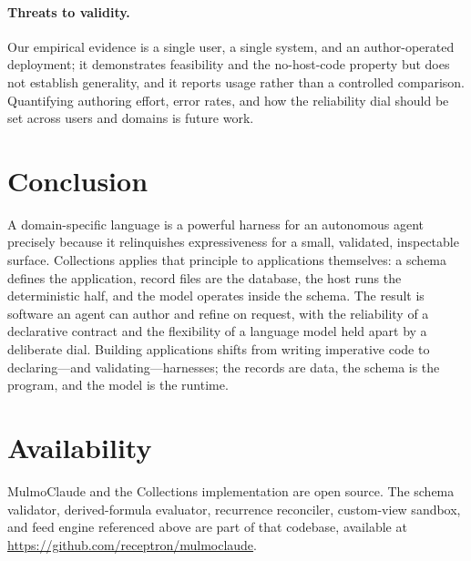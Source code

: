 \documentclass[11pt]{article}
\begin{document}
\paragraph{Threats to validity.}
Our empirical evidence is a single user, a single system, and an author-operated
deployment; it demonstrates feasibility and the no-host-code property but does not
establish generality, and it reports usage rather than a controlled comparison.
Quantifying authoring effort, error rates, and how the reliability dial should be
set across users and domains is future work.

\section{Conclusion}
\label{sec:conclusion}

A domain-specific language is a powerful harness for an autonomous agent precisely
because it relinquishes expressiveness for a small, validated, inspectable
surface. Collections applies that principle to applications themselves: a schema
defines the application, record files are the database, the host runs the
deterministic half, and the model operates inside the schema. The result is
software an agent can author and refine on request, with the reliability of a
declarative contract and the flexibility of a language model held apart by a
deliberate dial. Building applications shifts from writing imperative code to
declaring---and validating---harnesses; the records are data, the schema is the
program, and the model is the runtime.

\section*{Availability}
MulmoClaude and the Collections implementation are open source. The schema
validator, derived-formula evaluator, recurrence reconciler, custom-view sandbox,
and feed engine referenced above are part of that codebase, available at
\url{https://github.com/receptron/mulmoclaude}.



\end{document}
